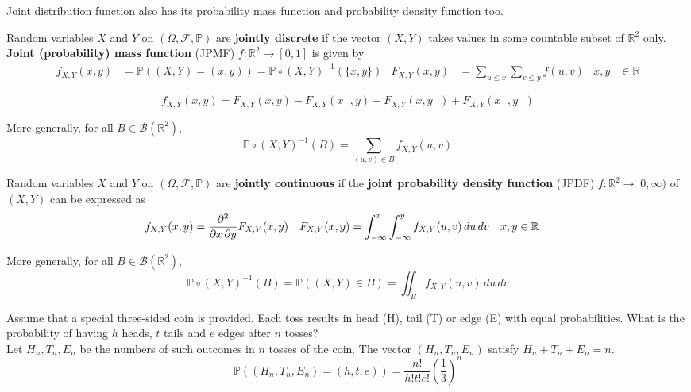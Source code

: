 \documentclass{huhtakm-template-book}
\newcommand{\prob}{\mathbb{P}}
\begin{document}
    Joint distribution function also has its probability mass function and probability density function too.
    \begin{defn}
        Random variables $X$ and $Y$ on $(\Omega,\mathcal{F},\prob)$ are \textbf{jointly discrete} if the vector $(X,Y)$ takes values in some countable subset of $\mathbb{R}^{2}$ only.\\
        \textbf{Joint (probability) mass function} (JPMF) $f:\mathbb{R}^{2}\to [0,1]$ is given by
        \begin{align*}
            f_{X,Y}(x,y)&=\prob((X,Y)=(x,y))=\prob\circ(X,Y)^{-1}(\{x,y\}) & F_{X,Y}(x,y)&=\sum_{u\leq x}\sum_{v\leq y}f(u,v) & x,y&\in\mathbb{R}
        \end{align*}
    \end{defn}
    \begin{rem}
        \begin{equation*}
            f_{X,Y}(x,y)=F_{X,Y}(x,y)-F_{X,Y}(x^{-},y)-F_{X,Y}(x,y^{-})+F_{X,Y}(x^{-},y^{-})
        \end{equation*}
    \end{rem}
    \begin{rem}
        More generally, for all $B\in\mathcal{B}(\mathbb{R}^{2})$,
        \begin{equation*}
            \prob\circ(X,Y)^{-1}(B)=\sum_{(u,v)\in B}f_{X,Y}(u,v)
        \end{equation*}
    \end{rem}
    \begin{defn}
        Random variables $X$ and $Y$ on $(\Omega,\mathcal{F},\prob)$ are \textbf{jointly continuous} if the \textbf{joint probability density function} (JPDF) $f:\mathbb{R}^{2}\to [0,\infty)$ of $(X,Y)$ can be expressed as
        \begin{align*}
            f_{X,Y}(x,y)&=\pdv*{F_{X,Y}(x,y)}{x,y} & F_{X,Y}(x,y)&=\int_{-\infty}^{x}\int_{-\infty}^{y}f_{X,Y}(u,v)\,du\,dv & x,y&\in\mathbb{R}
        \end{align*}
    \end{defn}
    \begin{rem}
        More generally, for all $B\in\mathcal{B}(\mathbb{R}^{2})$,
        \begin{equation*}
            \prob\circ(X,Y)^{-1}(B)=\prob((X,Y)\in B)=\iint_{B}f_{X,Y}(u,v)\,du\,dv
        \end{equation*}
    \end{rem}
    \begin{eg}
    	Assume that a special three-sided coin is provided. Each toss results in head (H), tail (T) or edge (E) with equal probabilities. What is the probability of having $h$ heads, $t$ tails and $e$ edges after $n$ tosses?\\
    	Let $H_{n},T_{n},E_{n}$ be the numbers of such outcomes in $n$ tosses of the coin. The vector $(H_{n},T_{n},E_{n})$ satisfy $H_{n}+T_{n}+E_{n}=n$.
    	\begin{equation*}
    		\prob((H_{n},T_{n},E_{n})=(h,t,e))=\frac{n!}{h!t!e!}\left(\frac{1}{3}\right)^{n}
    	\end{equation*}
    \end{eg}
\end{document}
